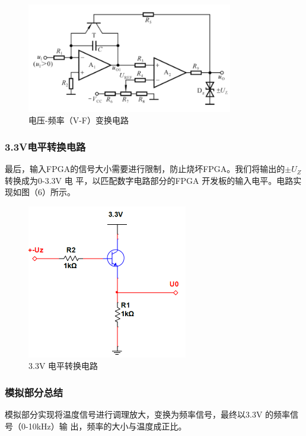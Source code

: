 \documentclass[12pt,a4paper]{ctexart}
\begin{document}
\begin{figure}[H]
  \centering
  \includegraphics[width=9cm]{pic/2.1.5.png}
  \caption{电压-频率（V-F）变换电路}
\end{figure}

\subsubsection{3.3V电平转换电路}
最后，输入FPGA的信号大小需要进行限制，防止烧坏FPGA。我们将输出的$\pm U_Z$转换成为0-3.3V 电
平，以匹配数字电路部分的FPGA
开发板的输入电平。电路实现如图（6）所示。
\begin{figure}[H]
  \centering
  \includegraphics[width=7cm]{pic/2.1.6.png}
  \caption{3.3V 电平转换电路}
\end{figure}

\subsubsection{模拟部分总结}
模拟部分实现将温度信号进行调理放大，变换为频率信号，最终以3.3V 的频率信号（0-10kHz）输
出，频率的大小与温度成正比。
\end{document}

